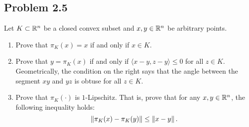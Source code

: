 \documentclass[12pt]{article}
\begin{document}
\newpage 

\subsection{Problem 2.5}

\begin{problem}
	Let $K \subset \mathbb{R}^n$ be a closed convex subset and $x, y \in \mathbb{R}^n$ be arbitrary points. 
    \begin{enumerate}[label = (\alph*)]
        \item Prove that $\pi_K(x) = x$ if and only if $x \in K$. 
        \item Prove that $y = \pi_K(x)$ if and only if $\langle x - y, z - y \rangle \leq 0$ for all $z \in K$. Geometrically, the condition on the right says that the angle between the segment $xy$ and $yz$ is obtuse for all $z \in K$.
        \item Prove that $\pi_K(\cdot)$ is $1$-Lipschitz. That is, prove that for any $x, y \in \mathbb{R}^n$, the following inequality holds:
        \[
            \left\lVert\pi_K(x) - \pi_K(y)\right\rVert \leq \left\lVert x-y\right\rVert. 
        \]
    \end{enumerate}
\end{problem}
\end{document}
